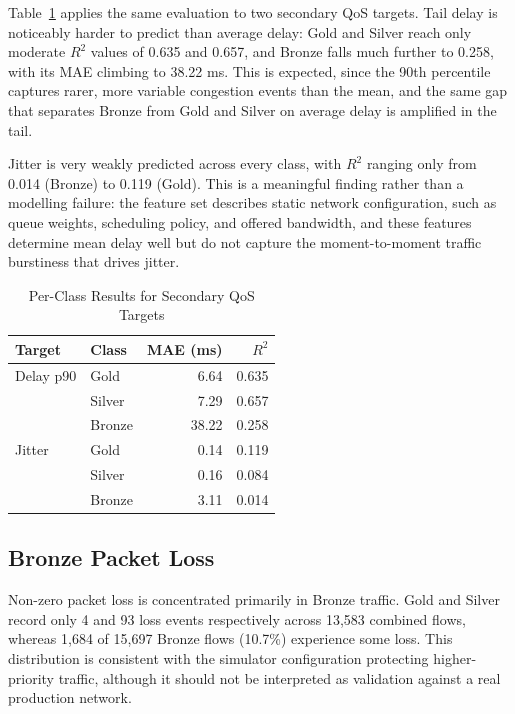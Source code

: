 \documentclass[conference]{IEEEtran}
\begin{document}
Table~\ref{tab:secondary} applies the same evaluation to two secondary QoS targets. Tail delay is noticeably harder to predict than average delay: Gold and Silver reach only moderate $R^2$ values of 0.635 and 0.657, and Bronze falls much further to 0.258, with its MAE climbing to 38.22 ms. This is expected, since the 90th percentile captures rarer, more variable congestion events than the mean, and the same gap that separates Bronze from Gold and Silver on average delay is amplified in the tail.

Jitter is very weakly predicted across every class, with $R^2$ ranging only from 0.014 (Bronze) to 0.119 (Gold). This is a meaningful finding rather than a modelling failure: the feature set describes static network configuration, such as queue weights, scheduling policy, and offered bandwidth, and these features determine mean delay well but do not capture the moment-to-moment traffic burstiness that drives jitter.

\begin{table}[t]
\caption{Per-Class Results for Secondary QoS Targets}
\label{tab:secondary}
\centering
\setlength{\tabcolsep}{5pt}
\begin{tabular}{llrr}
\toprule
Target & Class & MAE (ms) & $R^2$ \\
\midrule
Delay p90 & Gold    & 6.64  & 0.635 \\
          & Silver  & 7.29  & 0.657 \\
          & Bronze  & 38.22 & 0.258 \\
\midrule
Jitter    & Gold    & 0.14 & 0.119 \\
          & Silver  & 0.16 & 0.084 \\
          & Bronze  & 3.11 & 0.014 \\
\bottomrule
\end{tabular}
\end{table}

\subsection{Bronze Packet Loss}

Non-zero packet loss is concentrated primarily in Bronze traffic. Gold and Silver record only 4 and 93 loss events respectively across 13,583 combined flows, whereas 1,684 of 15,697 Bronze flows (10.7\%) experience some loss. This distribution is consistent with the simulator configuration protecting higher-priority traffic, although it should not be interpreted as validation against a real production network.
\end{document}
